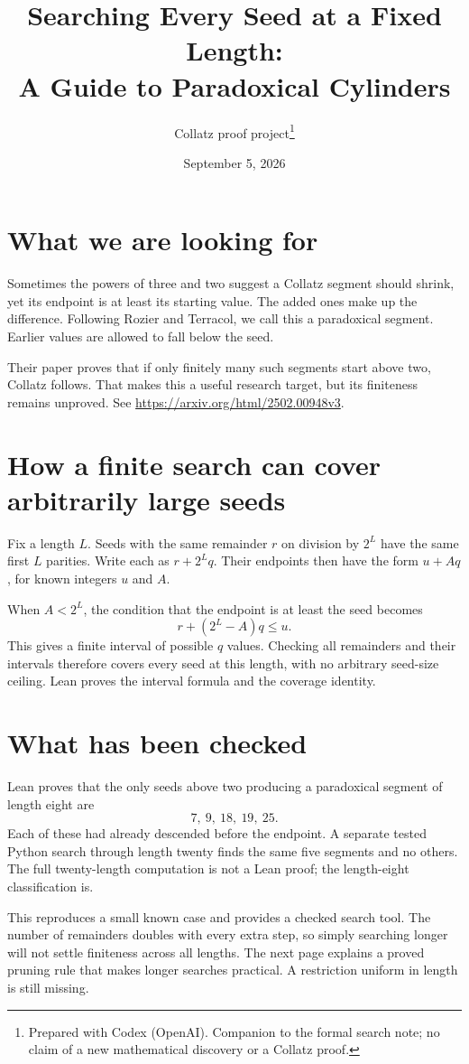 \documentclass[10pt]{article}
\title{Searching Every Seed at a Fixed Length:\\A Guide to Paradoxical Cylinders}
\author{Collatz proof project\thanks{Prepared with Codex (OpenAI). Companion to the formal search note; no claim of a new mathematical discovery or a Collatz proof.}}
\date{September 5, 2026}
\begin{document}
\maketitle
\section{What we are looking for}
Sometimes the powers of three and two suggest a Collatz segment should shrink, yet its endpoint is at least its starting value. The added ones make up the difference. Following Rozier and Terracol, we call this a paradoxical segment. Earlier values are allowed to fall below the seed.

Their paper proves that if only finitely many such segments start above two, Collatz follows. That makes this a useful research target, but its finiteness remains unproved. See \url{https://arxiv.org/html/2502.00948v3}.
\section{How a finite search can cover arbitrarily large seeds}
Fix a length $L$. Seeds with the same remainder $r$ on division by $2^L$ have the same first $L$ parities. Write each as $r+2^Lq$. Their endpoints then have the form $u+Aq$, for known integers $u$ and $A$.

When $A<2^L$, the condition that the endpoint is at least the seed becomes
\[
r+(2^L-A)q\le u.
\]
This gives a finite interval of possible $q$ values. Checking all remainders and their intervals therefore covers every seed at this length, with no arbitrary seed-size ceiling. Lean proves the interval formula and the coverage identity.
\section{What has been checked}
Lean proves that the only seeds above two producing a paradoxical segment of length eight are
\[
7,\ 9,\ 18,\ 19,\ 25.
\]
Each of these had already descended before the endpoint. A separate tested Python search through length twenty finds the same five segments and no others. The full twenty-length computation is not a Lean proof; the length-eight classification is.

This reproduces a small known case and provides a checked search tool. The number of remainders doubles with every extra step, so simply searching longer will not settle finiteness across all lengths. The next page explains a proved pruning rule that makes longer searches practical. A restriction uniform in length is still missing.
\end{document}

